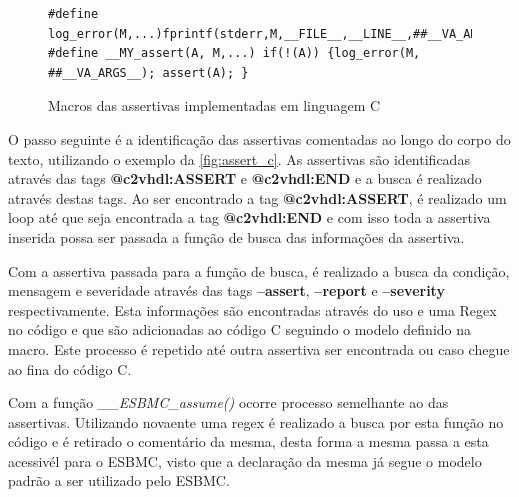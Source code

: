 \begin{figure}[H]
\caption{\label{fig:macro} Macros das assertivas implementadas em linguagem C}
	\begin{center}
    \begin{minipage}{0.99\textwidth}
    \begin{lstlisting}       
#define log_error(M,...)fprintf(stderr,M,__FILE__,__LINE__,##__VA_ARGS__)
#define __MY_assert(A, M,...) if(!(A)) {log_error(M, ##__VA_ARGS__); assert(A); }
    \end{lstlisting}
    \end{minipage}
	\end{center}
\end{figure}

\par
O passo seguinte é a identificação das assertivas comentadas ao longo do corpo do texto, utilizando o exemplo da \autoref{fig:assert_c}. As assertivas são identificadas através das tags \textbf{@c2vhdl:ASSERT} e \textbf{@c2vhdl:END} e a busca é realizado através destas tags. Ao ser encontrado a tag \textbf{@c2vhdl:ASSERT}, é realizado um loop até que seja encontrada a tag \textbf{@c2vhdl:END} e com isso toda a assertiva inserida possa ser passada a função de busca das informações da assertiva.

\par
Com a assertiva passada para a função de busca, é realizado a busca da condição, mensagem e severidade através das tags \textbf{--assert}, \textbf{--report} e \textbf{--severity} respectivamente. Esta informações são encontradas através do uso e uma Regex no código e que são adicionadas ao código C seguindo o modelo definido na macro. Este processo é repetido até outra assertiva ser encontrada ou caso chegue ao fina do código C.

\par
Com a função \textit{\_\_ESBMC\_assume()} ocorre processo semelhante ao das assertivas. Utilizando novaente uma regex é realizado a busca por esta função no código e é retirado o comentário da mesma, desta forma a mesma passa a esta acessivél para o ESBMC, visto que a declaração da mesma já segue o modelo padrão a ser utilizado pelo ESBMC.

